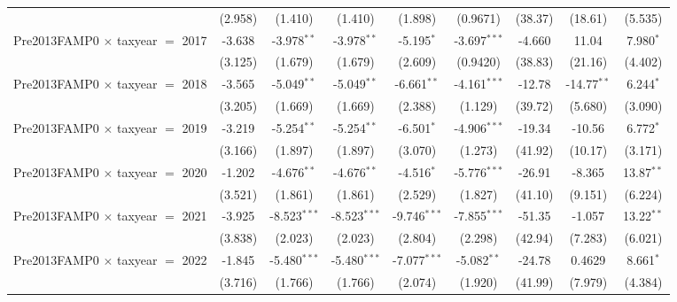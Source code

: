 {\begin{tabular}{lcccccccc}
                                           & (2.958)       & (1.410)        & (1.410)        & (1.898)        & (0.9671)       & (38.37)       & (18.61)       & (5.535)\\   
   Pre2013FAMP0 $\times$ taxyear $=$ 2017  & -3.638        & -3.978$^{**}$  & -3.978$^{**}$  & -5.195$^{*}$   & -3.697$^{***}$ & -4.660        & 11.04         & 7.980$^{*}$\\   
                                           & (3.125)       & (1.679)        & (1.679)        & (2.609)        & (0.9420)       & (38.83)       & (21.16)       & (4.402)\\   
   Pre2013FAMP0 $\times$ taxyear $=$ 2018  & -3.565        & -5.049$^{**}$  & -5.049$^{**}$  & -6.661$^{**}$  & -4.161$^{***}$ & -12.78        & -14.77$^{**}$ & 6.244$^{*}$\\   
                                           & (3.205)       & (1.669)        & (1.669)        & (2.388)        & (1.129)        & (39.72)       & (5.680)       & (3.090)\\   
   Pre2013FAMP0 $\times$ taxyear $=$ 2019  & -3.219        & -5.254$^{**}$  & -5.254$^{**}$  & -6.501$^{*}$   & -4.906$^{***}$ & -19.34        & -10.56        & 6.772$^{*}$\\   
                                           & (3.166)       & (1.897)        & (1.897)        & (3.070)        & (1.273)        & (41.92)       & (10.17)       & (3.171)\\   
   Pre2013FAMP0 $\times$ taxyear $=$ 2020  & -1.202        & -4.676$^{**}$  & -4.676$^{**}$  & -4.516$^{*}$   & -5.776$^{***}$ & -26.91        & -8.365        & 13.87$^{**}$\\   
                                           & (3.521)       & (1.861)        & (1.861)        & (2.529)        & (1.827)        & (41.10)       & (9.151)       & (6.224)\\   
   Pre2013FAMP0 $\times$ taxyear $=$ 2021  & -3.925        & -8.523$^{***}$ & -8.523$^{***}$ & -9.746$^{***}$ & -7.855$^{***}$ & -51.35        & -1.057        & 13.22$^{**}$\\   
                                           & (3.838)       & (2.023)        & (2.023)        & (2.804)        & (2.298)        & (42.94)       & (7.283)       & (6.021)\\   
   Pre2013FAMP0 $\times$ taxyear $=$ 2022  & -1.845        & -5.480$^{***}$ & -5.480$^{***}$ & -7.077$^{***}$ & -5.082$^{**}$  & -24.78        & 0.4629        & 8.661$^{*}$\\   
                                           & (3.716)       & (1.766)        & (1.766)        & (2.074)        & (1.920)        & (41.99)       & (7.979)       & (4.384)\\   

\end{tabular}}
